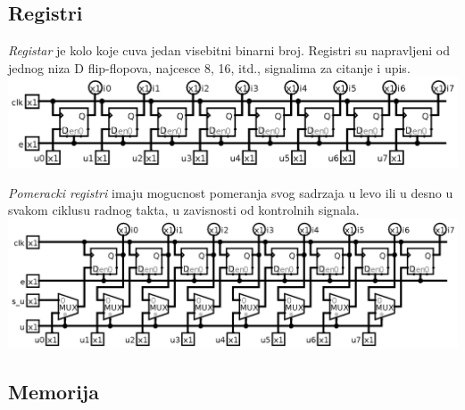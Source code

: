 \documentclass[12p,a4paper]{article}
\begin{document}
\begin{multicols}{2}
    \subsection{Registri}

    \emph{Registar} je kolo koje cuva jedan visebitni binarni broj. Registri
    su napravljeni od jednog niza D flip-flopova, najcesce 8, 16, itd., 
    signalima za citanje i upis.
    \includegraphics[width=\columnwidth]{Figures/reg_8bit.png}

    \emph{Pomeracki registri} imaju mogucnost pomeranja svog sadrzaja u levo
    ili u desno u svakom ciklusu radnog takta, u zavisnosti od kontrolnih
    signala.
    \includegraphics[width=\columnwidth]{Figures/shift_reg.png}

    \subsection{Memorija}
    

\end{multicols}
\end{document}
